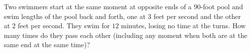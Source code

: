 Two swimmers start at the same moment at opposite ends of a $90$-foot pool and swim lengths of the pool back and forth, one at $3$ feet per second and the other at $2$ feet per second. They swim for $12$ minutes, losing no time at the turns. How many times do they pass each other (including any moment when both are at the same end at the same time)?
